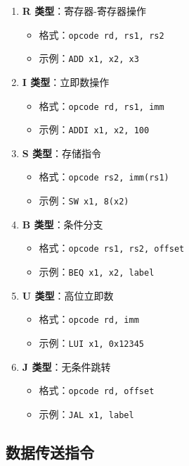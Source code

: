 \begin{enumerate}
  \item \textbf{R 类型}：寄存器-寄存器操作
    \begin{itemize}
      \item 格式：\texttt{opcode rd, rs1, rs2}
      \item 示例：\texttt{ADD x1, x2, x3}
    \end{itemize}

  \item \textbf{I 类型}：立即数操作
    \begin{itemize}
      \item 格式：\texttt{opcode rd, rs1, imm}
      \item 示例：\texttt{ADDI x1, x2, 100}
    \end{itemize}

  \item \textbf{S 类型}：存储指令
    \begin{itemize}
      \item 格式：\texttt{opcode rs2, imm(rs1)}
      \item 示例：\texttt{SW x1, 8(x2)}
    \end{itemize}

  \item \textbf{B 类型}：条件分支
    \begin{itemize}
      \item 格式：\texttt{opcode rs1, rs2, offset}
      \item 示例：\texttt{BEQ x1, x2, label}
    \end{itemize}

  \item \textbf{U 类型}：高位立即数
    \begin{itemize}
      \item 格式：\texttt{opcode rd, imm}
      \item 示例：\texttt{LUI x1, 0x12345}
    \end{itemize}

  \item \textbf{J 类型}：无条件跳转
    \begin{itemize}
      \item 格式：\texttt{opcode rd, offset}
      \item 示例：\texttt{JAL x1, label}
    \end{itemize}
\end{enumerate}

\subsection{数据传送指令}

